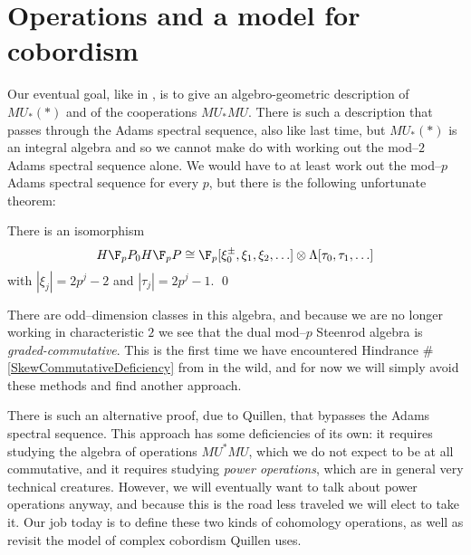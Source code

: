 \section{Operations and a model for cobordism}

Our eventual goal, like in , is to give an algebro-geometric description of $MU_*(*)$ and of the cooperations $MU_* MU$.  There is such a description that passes through the Adams spectral sequence, also like last time, but $MU_*(*)$ is an integral algebra and so we cannot make do with working out the mod--$2$ Adams spectral sequence alone.  We would have to at least work out the mod--$p$ Adams spectral sequence for every $p$, but there is the following unfortunate theorem:
\begin{theorem}
There is an isomorphism
\[H\F_pP_0 H\F_pP \cong \F_p[\xi_0^\pm, \xi_1, \xi_2, \ldots] \otimes \Lambda[\tau_0, \tau_1, \ldots]\]
with $|\xi_j| = 2p^j-2$ and $|\tau_j| = 2p^j - 1$. \qed
\end{theorem}
\noindent There are odd--dimension classes in this algebra, and because we are no longer working in characteristic $2$ we see that the dual mod--$p$ Steenrod algebra is \emph{graded-commutative}.  This is the first time we have encountered Hindrance \#\ref{SkewCommutativeDeficiency} from  in the wild, and for now we will simply avoid these methods and find another approach.

There is such an alternative proof, due to Quillen, that bypasses the Adams spectral sequence.  This approach has some deficiencies of its own: it requires studying the algebra of operations $MU^* MU$, which we do not expect to be at all commutative, and it requires studying \textit{power operations}, which are in general very technical creatures.  However, we will eventually want to talk about power operations anyway, and because this is the road less traveled we will elect to take it.  Our job today is to define these two kinds of cohomology operations, as well as revisit the model of complex cobordism Quillen uses.

